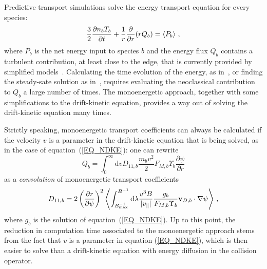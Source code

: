 Predictive transport simulations solve the energy transport equation for every species:
\begin{equation}
\frac{3}{2}\frac{\partial n_bT_b}{\partial t}+ \frac{1}{r}\frac{\partial}{\partial r}(r Q_b)= \left\langle{P_b}\right\rangle\,,
\end{equation}
where $P_b$ is the net energy input to species $b$ and the energy flux $Q_b$ contains a turbulent contribution, at least close to the edge, that is currently provided by simplified models~\citep{turkin2011predictive}. Calculating the time evolution of the energy, as in~\citep{sunnpedersen2015op11}, or finding the steady-sate solution as in~\citep{geiger2014w7x}, requires evaluating the neoclassical contribution to $Q_b$ a large number of times. The monoenergetic approach, together with some simplifications to the drift-kinetic equation, provides a way out of solving the drift-kinetic equation many times.

Strictly speaking, monoenergetic transport coefficients can always be calculated if the velocity $v$ is a parameter in the drift-kinetic equation that is being solved, as in the case of equation~(\ref{EQ_NDKE}): one can rewrite
\begin{equation}
Q_b = \int_0^\infty\mathrm{d} v D_{11,b}\frac{m_bv^2}{2} F_{M,b} \Upsilon_b\frac{\partial\psi}{\partial r}
\end{equation}
as a {\textit{convolution}} of monoenergetic transport coefficients
\begin{equation}
D_{11,b} = 2\left(\frac{\partial r}{\partial\psi}\right)^2\left\langle\int_{B^{-1}_{{\rm max}}}^{B^{-1}}\mathrm{d}\lambda\frac{v^3 B}{|v_\parallel |}\frac{g_b}{F_{M,b}\Upsilon_b}\mathbf{v}_{D,b}\cdot\nabla\psi\right\rangle \,,
\label{EQ_D11}
\end{equation}
where $g_b$ is the solution of equation~(\ref{EQ_NDKE}). Up to this point, the reduction in computation time associated to the monoenergetic approach stems from the fact that $v$ is a parameter in equation (\ref{EQ_NDKE}), which is then easier to solve than a drift-kinetic equation with energy diffusion in the collision operator.

